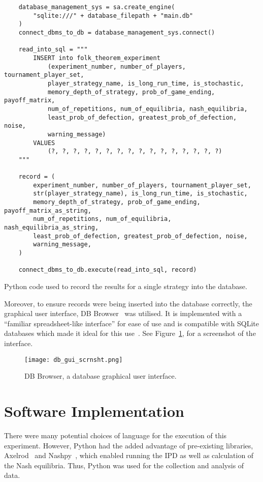 \begin{listing}
\begin{verbatim}
    database_management_sys = sa.create_engine(
        "sqlite:///" + database_filepath + "main.db"
    )
    connect_dbms_to_db = database_management_sys.connect()

    read_into_sql = """
        INSERT into folk_theorem_experiment 
            (experiment_number, number_of_players, tournament_player_set, 
            player_strategy_name, is_long_run_time, is_stochastic, 
            memory_depth_of_strategy, prob_of_game_ending, payoff_matrix, 
            num_of_repetitions, num_of_equilibria, nash_equilibria, 
            least_prob_of_defection, greatest_prob_of_defection, noise, 
            warning_message)
        VALUES 
            (?, ?, ?, ?, ?, ?, ?, ?, ?, ?, ?, ?, ?, ?, ?, ?)
    """

    record = (
        experiment_number, number_of_players, tournament_player_set,
        str(player_strategy_name), is_long_run_time, is_stochastic,
        memory_depth_of_strategy, prob_of_game_ending, payoff_matrix_as_string,
        num_of_repetitions, num_of_equilibria, nash_equilibria_as_string,
        least_prob_of_defection, greatest_prob_of_defection, noise,
        warning_message,
    )

    connect_dbms_to_db.execute(read_into_sql, record)
\end{verbatim}
\caption{Python code used to record the results for a single strategy into the database.}\label{code:python_to_db}
\end{listing}

Moreover, to ensure records were being inserted into the database correctly, the
graphical user interface, DB Browser~\cite{piacentini2015db} was utilised. It is implemented
with a ``familiar spreadsheet-like interface'' for ease of use and is compatible
with SQLite databases which made it ideal for this use~\cite{piacentini2015db}.
See Figure~\ref{fig:db_browser_scrnsht}, for a screenshot of the interface.

\begin{figure}
    \centering
    \texttt{[image: db\_gui\_scrnsht.png]}
    \caption{DB Browser, a database graphical user interface.}\label{fig:db_browser_scrnsht}
\end{figure}


\section{Software Implementation}\label{sec:Software_Implementation}
There were many potential choices of language for the execution of this 
experiment. However, Python had the added advantage of pre-existing libraries, 
Axelrod~\cite{axelrodproject} and Nashpy~\cite{Nashpy2019}, which enabled running the IPD as well as calculation of the 
Nash equilibria. Thus, Python was used for the collection and analysis of 
data.

